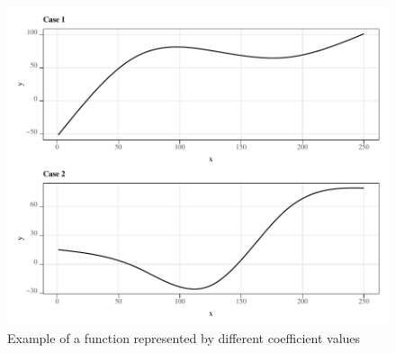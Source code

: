 \documentclass[
]{article}
\begin{document}
\begin{figure}[H]

{\centering \includegraphics[width=6in,]{Figures/g_il_y} 

}

\caption{Example of a function represented by different coefficient values}\label{fig:ex-fx}
\end{figure}

\clearpage

  
\end{document}
